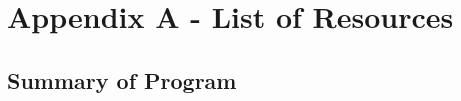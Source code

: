 \documentclass[12pt]{article}
\begin{document}



\nocite{*}


\section{Appendix A - List of Resources}

\subsection{Summary of Program}
\end{document}
